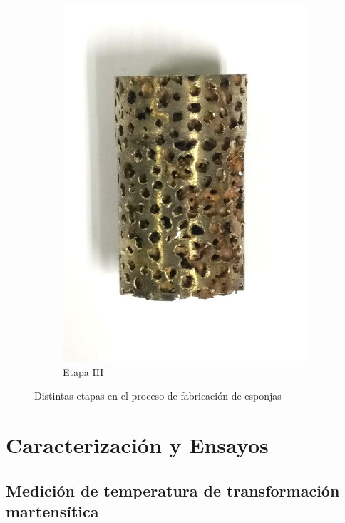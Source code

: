 \documentclass[a4paper,12pt,fleqn,twoside,openany]{book}
\begin{document}
\begin{figure}
\begin{subfigure}{0.28\textwidth}
        \includegraphics[width=\textwidth]{Img/Procedimiento/proceso3.jpg}
        \caption{Etapa III}
        \label{fig:proceso3}
    \end{subfigure}
  \label{fig: proceso}
  \caption{Distintas etapas en el proceso de fabricación de esponjas}
\end{figure}


\section{Caracterización y Ensayos}



\subsection{Medición de temperatura de transformación martensítica}
\end{document}
